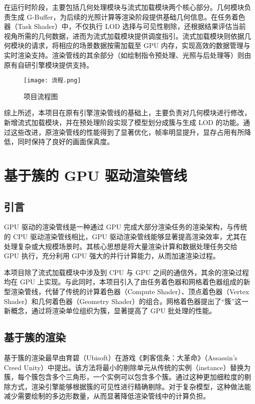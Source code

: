 \par 在运行时阶段，主要包括几何处理模块与流式加载模块两个核心部分。几何模块负责生成 G-Buffer\cite{lauritzen2010}，为后续的光照计算等渲染阶段提供基础几何信息。在任务着色器（Task Shader）中，不仅执行 LOD 选择与可见性剔除，还根据结果评估当前视角所需的几何数据，进而为流式加载模块提供调度指引。流式加载模块则依据几何模块的请求，将相应的场景数据按需加载至 GPU 内存，实现高效的数据管理与实时渲染支持。渲染管线的其余部分（如绘制指令预处理、光照与后处理等）则由原有自研引擎模块提供支持。

\begin{figure}[htbp]
    \centering
    \texttt{[image: 流程.png]}
    \caption{\label{fig:流程}项目流程图}
\end{figure}

\par 综上所述，本项目在原有引擎渲染管线的基础上，主要负责对几何模块进行修改，新增流式加载模块，并在预处理阶段实现了模型划分成簇与生成 LOD 的功能。通过这些改进，原渲染管线的性能得到了显著优化，帧率明显提升，显存占用有所降低，同时保持了良好的画面保真度。

\section{基于簇的 GPU 驱动渲染管线}

\subsection{引言}

GPU 驱动的渲染管线是一种通过 GPU 完成大部分渲染任务的渲染架构，与传统的 CPU 驱动渲染管线相比，GPU 驱动渲染管线能够显著提高渲染效率，尤其在处理复杂或大规模场景时。其核心思想是将大量渲染计算和数据处理任务交给 GPU 执行，充分利用 GPU 强大的并行计算能力，从而加速渲染过程。

本项目除了流式加载模块中涉及到 CPU 与 GPU 之间的通信外，其余的渲染过程均在 GPU 上实现。与此同时，本项目引入了由任务着色器和网格着色器组成的新型渲染管线，代替了传统的计算着色器（Compute Shader）、顶点着色器（Vertex Shader）和几何着色器（Geometry Shader）的组合。网格着色器提出了“簇”这一新概念，通过将渲染单位组织为簇，显著提高了 GPU 批处理的性能\cite{Czubala2024}。

\subsection{基于簇的渲染}

基于簇的渲染最早由育碧（Ubisoft）在游戏《刺客信条：大革命》（Assassin's Creed Unity）中提出\cite{Ubisoft2015}。该方法将最小的剔除单元从传统的实例（instance）替换为簇，每个簇包含多个三角形，一个实例可以包含多个簇。通过这种更加细粒度的剔除方式，渲染引擎能够根据簇的可见性进行精确剔除。对于复杂模型，这种做法能减少需要绘制的多边形数量，从而显著降低渲染管线中的计算负担。

